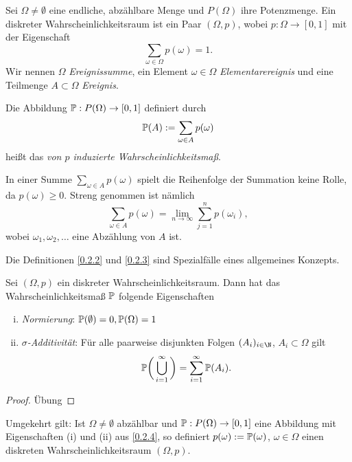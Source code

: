 \begin{df} \label{0.2.2}
	Sei $\Omega \neq \emptyset$ eine endliche, abzählbare Menge und $P(\Omega)$ ihre Potenzmenge.
	Ein diskreter Wahrscheinlichkeitsraum ist ein Paar $(\Omega, p)$, wobei $p: \Omega \to [0,1]$ mit der Eigenschaft
	\[
		\sum_{\omega \in \Omega} p(\omega) = 1.
	\]
	Wir nennen $\Omega$ \emph{Ereignissumme}, ein Element $\omega \in \Omega$ \emph{Elementarereignis} und eine Teilmenge $A \subset \Omega$ \emph{Ereignis}.
\end{df}

\begin{df} \label{0.2.3}
	Die Abbildung $\P : P(\Omega) \to [0,1]$ definiert durch
	\[
		\P(A) := \sum_{\omega \in A} p(\omega)
	\]
	heißt das \emph{von $p$ induzierte Wahrscheinlichkeitsmaß}.
\end{df}

\begin{nt*}
	In einer Summe $\sum_{\omega \in A} p(\omega)$ spielt die Reihenfolge der Summation keine Rolle, da $p(\omega) \ge 0$.
	Streng genommen ist nämlich
	\[
		\sum_{\omega \in A} p(\omega)
		= \lim_{n\to \infty} \sum_{j=1}^n p(\omega_i),
	\]
	wobei $\omega_1, \omega_2, \dotsc$ eine Abzählung von $A$ ist.
\end{nt*}

Die Definitionen \ref{0.2.2} und \ref{0.2.3} sind Spezialfälle eines allgemeines Konzepts.

\begin{nt} \label{0.2.4}
	Sei $(\Omega, p)$ ein diskreter Wahrscheinlichkeitsraum.
	Dann hat das Wahrscheinlichkeitsmaß $\P$ folgende Eigenschaften
	\begin{enumerate}[(i)]
		\item
			\emph{Normierung}:
			$\P(\emptyset) = 0, \P(\Omega) = 1$
		\item
			\emph{$\sigma$-Additivität}:
			Für alle paarweise disjunkten Folgen $(A_i)_{i \in \N}$, $A_i \subset \Omega$ gilt
			\[
				\P \bigg( \bigcup_{i=1}^\infty \bigg) = \sum_{i=1}^\infty \P(A_i).
			\]
	\end{enumerate}
	\begin{proof}
		Übung
	\end{proof}
\end{nt}

\begin{nt} \label{0.2.5}
	Umgekehrt gilt:
	Ist $\Omega \neq \emptyset$ abzählbar und $\P : P(\Omega) \to [0,1]$ eine Abbildung mit Eigenschaften (i) und (ii) aus \ref{0.2.4}, so definiert $p(\omega) := \P({\omega})$, $\omega \in \Omega$ einen diskreten Wahrscheinlichkeitsraum $(\Omega, p)$.
\end{nt}

